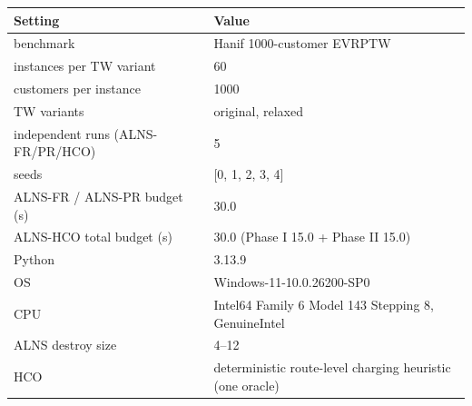 \begin{tabular}{ll}
\toprule
Setting & Value \\
\midrule
benchmark & Hanif 1000-customer EVRPTW \\
instances per TW variant & 60 \\
customers per instance & 1000 \\
TW variants & original, relaxed \\
independent runs (ALNS-FR/PR/HCO) & 5 \\
seeds & [0, 1, 2, 3, 4] \\
ALNS-FR / ALNS-PR budget (s) & 30.0 \\
ALNS-HCO total budget (s) & 30.0 (Phase I 15.0 + Phase II 15.0) \\
Python & 3.13.9 \\
OS & Windows-11-10.0.26200-SP0 \\
CPU & Intel64 Family 6 Model 143 Stepping 8, GenuineIntel \\
ALNS destroy size & 4–12 \\
HCO & deterministic route-level charging heuristic (one oracle) \\
\bottomrule
\end{tabular}

